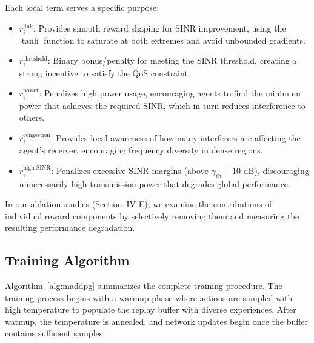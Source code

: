 \documentclass[conference]{IEEEtran}
\begin{document}
Each local term serves a specific purpose:
\begin{itemize}
    \item $r_i^{\text{link}}$: Provides smooth reward shaping for SINR improvement, using the $\tanh$ function to saturate at both extremes and avoid unbounded gradients.
    \item $r_i^{\text{threshold}}$: Binary bonus/penalty for meeting the SINR threshold, creating a strong incentive to satisfy the QoS constraint.
    \item $r_i^{\text{power}}$: Penalizes high power usage, encouraging agents to find the minimum power that achieves the required SINR, which in turn reduces interference to others.
    \item $r_i^{\text{congestion}}$: Provides local awareness of how many interferers are affecting the agent's receiver, encouraging frequency diversity in dense regions.
    \item $r_i^{\text{high-SINR}}$: Penalizes excessive SINR margins (above $\gamma_{\text{th}} + 10$ dB), discouraging unnecessarily high transmission power that degrades global performance.
\end{itemize}

In our ablation studies (Section~IV-E), we examine the contributions of individual reward components by selectively removing them and measuring the resulting performance degradation.

\subsection{Training Algorithm}

Algorithm~\ref{alg:maddpg} summarizes the complete training procedure. The training process begins with a warmup phase where actions are sampled with high temperature to populate the replay buffer with diverse experiences. After warmup, the temperature is annealed, and network updates begin once the buffer contains sufficient samples.
\end{document}
